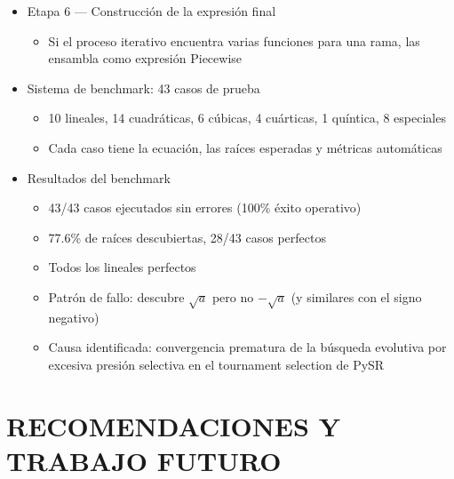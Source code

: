 \documentclass[12pt, a4paper]{article}
\begin{document}
\begin{itemize}[leftmargin=1.5em]
  \item Etapa 6 --- Construcción de la expresión final
  \begin{itemize}
    \item Si el proceso iterativo encuentra varias funciones para una rama, las ensambla como expresión Piecewise
  \end{itemize}

  \item Sistema de benchmark: 43 casos de prueba
  \begin{itemize}
\item 10 lineales, 14 cuadráticas, 6 cúbicas, 4 cuárticas, 1 quíntica, 8 especiales \item Cada caso tiene la ecuación, las raíces esperadas y métricas automáticas
  \end{itemize}

  \item Resultados del benchmark
  \begin{itemize}
\item 43/43 casos ejecutados sin errores (100\% éxito operativo) \item 77.6\% de raíces descubiertas, 28/43 casos perfectos \item Todos los lineales perfectos \item Patrón de fallo: descubre $\sqrt{a}$ pero no $-\sqrt{a}$ (y similares con el signo negativo) \item Causa identificada: convergencia prematura de la búsqueda evolutiva por excesiva presión selectiva en el tournament selection de PySR
  \end{itemize}

\end{itemize}

\section*{RECOMENDACIONES Y TRABAJO FUTURO}
\end{document}
